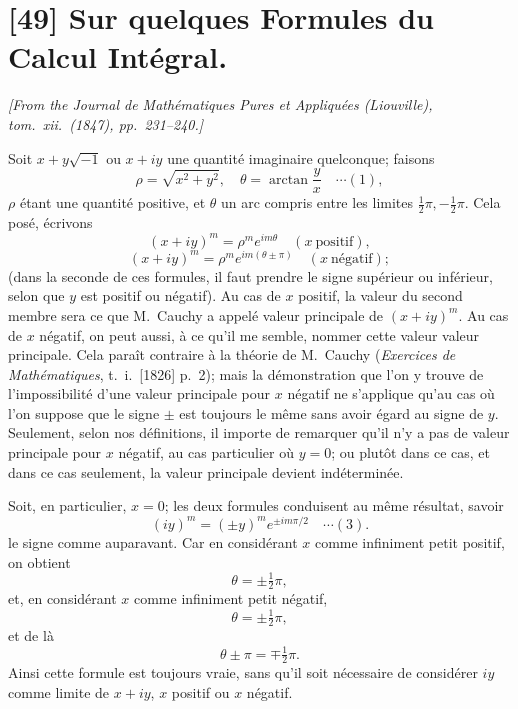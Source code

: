 \documentclass[12pt,a4paper]{article}
\begin{document}
\newpage

\section*{[49] Sur quelques Formules du Calcul Int\'egral.}

\textit{[From the Journal de Math\'ematiques Pures et Appliqu\'ees (Liouville), tom.~xii.~(1847), pp.~231--240.]}

\bigskip

Soit $x + y\sqrt{-1}$ ou $x + iy$ une quantit\'e imaginaire quelconque; faisons
\[
\rho = \sqrt{x^2 + y^2},\quad \theta = \arctan\frac{y}{x} \quad\cdots(1),
\]
$\rho$ \'etant une quantit\'e positive, et $\theta$ un arc compris entre les limites $\tfrac12\pi, -\tfrac12\pi$. Cela pos\'e, \'ecrivons
\[
(x + iy)^m = \rho^m e^{im\theta} \quad (x\ \text{positif}),
\]
\[
(x + iy)^m = \rho^m e^{im(\theta\pm\pi)} \quad (x\ \text{n\'egatif});
\]
(dans la seconde de ces formules, il faut prendre le signe sup\'erieur ou inf\'erieur, selon que $y$ est positif ou n\'egatif). Au cas de $x$ positif, la valeur du second membre sera ce que M.\ Cauchy a appel\'e valeur principale de $(x + iy)^m$. Au cas de $x$ n\'egatif, on peut aussi, \`a ce qu'il me semble, nommer cette valeur valeur principale. Cela para\^it contraire \`a la th\'eorie de M.\ Cauchy (\emph{Exercices de Math\'ematiques}, t.~i.~[1826] p.~2); mais la d\'emonstration que l'on y trouve de l'impossibilit\'e d'une valeur principale pour $x$ n\'egatif ne s'applique qu'au cas o\`u l'on suppose que le signe $\pm$ est toujours le m\^eme sans avoir \'egard au signe de $y$. Seulement, selon nos d\'efinitions, il importe de remarquer qu'il n'y a pas de valeur principale pour $x$ n\'egatif, au cas particulier o\`u $y = 0$; ou plut\^ot dans ce cas, et dans ce cas seulement, la valeur principale devient ind\'etermin\'ee.

Soit, en particulier, $x = 0$; les deux formules conduisent au m\^eme r\'esultat, savoir
\[
(iy)^m = (\pm y)^m e^{\pm im\pi/2} \quad\cdots(3).
\]
le signe comme auparavant. Car en consid\'erant $x$ comme infiniment petit positif, on obtient
\[
\theta = \pm\tfrac12\pi,
\]
et, en consid\'erant $x$ comme infiniment petit n\'egatif,
\[
\theta = \pm\tfrac12\pi,
\]
et de l\`a
\[
\theta \pm \pi = \mp\tfrac12\pi.
\]
Ainsi cette formule est toujours vraie, sans qu'il soit n\'ecessaire de consid\'erer $iy$ comme limite de $x + iy$, $x$ positif ou $x$ n\'egatif.
\end{document}
